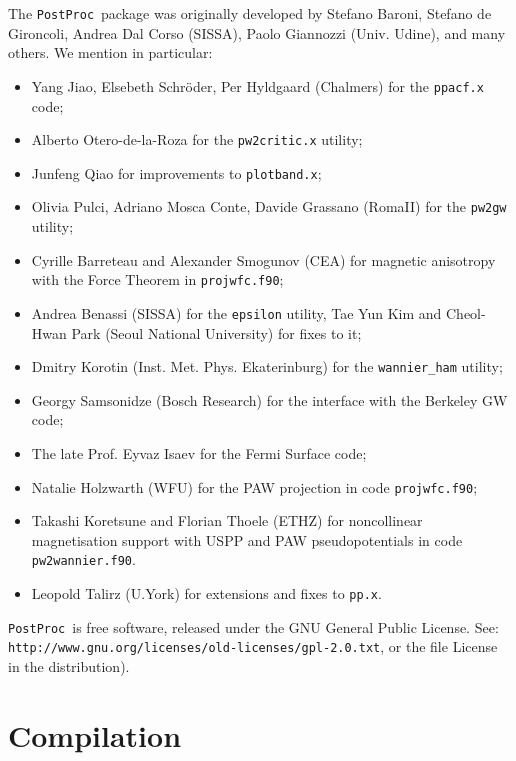 \documentclass[12pt,a4paper]{article}
\def\PostProc{\texttt{PostProc}}
\begin{document}
The \PostProc\ package was originally developed by Stefano Baroni, 
Stefano de Gironcoli, Andrea Dal Corso (SISSA), Paolo Giannozzi 
(Univ. Udine), and many others. We mention in particular: 
\begin{itemize}
\item Yang Jiao, Elsebeth Schr\"oder, Per Hyldgaard (Chalmers) for the
  \texttt{ppacf.x} code;
\item Alberto Otero-de-la-Roza for the \texttt{pw2critic.x} utility;
\item Junfeng Qiao for improvements to \texttt{plotband.x};
\item Olivia Pulci, Adriano Mosca Conte, Davide Grassano (RomaII)
      for the \texttt{pw2gw} utility;
\item Cyrille Barreteau and Alexander Smogunov (CEA) for 
      magnetic anisotropy with the Force Theorem in \texttt{projwfc.f90};
\item Andrea Benassi (SISSA) for the \texttt{epsilon} utility,
      Tae Yun Kim and Cheol-Hwan Park (Seoul National University)
      for fixes to it;
\item Dmitry Korotin (Inst. Met. Phys. Ekaterinburg) for the
      \texttt{wannier\_ham} utility;
\item Georgy Samsonidze (Bosch Research) for the interface
      with the Berkeley GW code;
\item The late Prof. Eyvaz Isaev for the Fermi Surface code;
\item Natalie Holzwarth (WFU) for the PAW projection in code
     \texttt{projwfc.f90};
\item Takashi Koretsune and Florian Thoele (ETHZ) for noncollinear 
      magnetisation support with USPP and PAW pseudopotentials in 
      code \texttt{pw2wannier.f90}.
\item Leopold Talirz (U.York) for extensions and fixes to \texttt{pp.x}.
\end{itemize}

\PostProc\ is free software, released under the 
GNU General Public License. See:\\
\texttt{http://www.gnu.org/licenses/old-licenses/gpl-2.0.txt}, 
or the file License in the distribution).
    


\section{Compilation}
\end{document}
